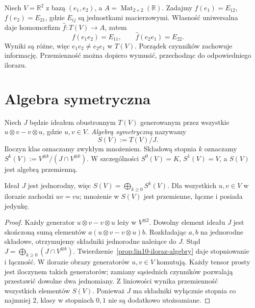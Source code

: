 \begin{przyklad}
\label{prz:lin10-nieprzemienna}
Niech \(V=\mathbb R^2\) z bazą
\((e_1,e_2)\), a \(A=\operatorname{Mat}_{2\times2}(\mathbb R)\).
Zadajmy \(f(e_1)=E_{12}\),
\(f(e_2)=E_{21}\), gdzie \(E_{ij}\)
są jednostkami macierzowymi.
Własność uniwersalna daje homomorfizm
\(\widehat f\colon T(V)\to A\), zatem
\[
 \widehat f(e_1e_2)=E_{11},\qquad
 \widehat f(e_2e_1)=E_{22}.
\]
Wyniki są różne, więc
\(e_1e_2\ne e_2e_1\) w \(T(V)\).
Porządek czynników zachowuje informację.
Przemienność można dopiero wymusić,
przechodząc do odpowiedniego ilorazu.
\end{przyklad}

\section{Algebra symetryczna}
\label{sec:lin10-symetryczna}

\begin{definicja}
\label{def:lin10-symetryczna}
Niech \(J\) będzie ideałem obustronnym
\(T(V)\) generowanym przez wszystkie
\(u\otimes v-v\otimes u\), gdzie \(u,v\in V\).
\emph{Algebrą symetryczną} nazywamy
\[
 S(V):=T(V)/J.
\]
Iloczyn klas oznaczamy zwykłym mnożeniem.
Składową stopnia \(k\) oznaczamy
\(S^k(V):=V^{\otimes k}/(J\cap V^{\otimes k})\).
W szczególności \(S^0(V)=K\),
\(S^1(V)=V\), a \(S(V)\) jest
algebrą przemienną.
\end{definicja}

\begin{stwierdzenie}
\label{prop:lin10-sym-stopnie}
Ideał \(J\) jest jednorodny, więc
\(S(V)=\bigoplus_{k\geq0}S^k(V)\).
Dla wszystkich \(u,v\in V\) w ilorazie
zachodzi \(uv=vu\); mnożenie w \(S(V)\)
jest przemienne, łączne i posiada jedynkę.
\end{stwierdzenie}
\begin{proof}
Każdy generator \(u\otimes v-v\otimes u\)
leży w \(V^{\otimes2}\).
Dowolny element ideału \(J\)
jest skończoną sumą elementów
\(a(u\otimes v-v\otimes u)b\).
Rozkładając \(a,b\) na jednorodne
składowe, otrzymujemy składniki
jednorodne należące do \(J\).
Stąd \(J=\bigoplus_{k\ge0}(J\cap V^{\otimes k})\).
Twierdzenie~\ref{prop:lin10-iloraz-algebry}
daje stopniowanie i łączność.
W ilorazie obrazy generatorów
\(u,v\in V\) komutują.
Każdy tensor prosty jest iloczynem
takich generatorów; zamiany sąsiednich
czynników pozwalają przestawić
dowolne dwa jednomiany. Z liniowości
wynika przemienność wszystkich
elementów \(S(V)\).
Ponieważ \(J\) ma składniki
wyłącznie stopnia co najmniej \(2\),
klasy w stopniach \(0,1\) nie są
dodatkowo utożsamiane.
\end{proof}

